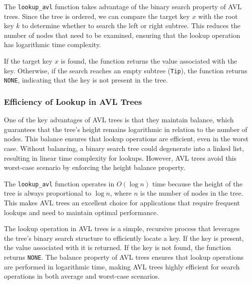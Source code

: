 The \texttt{lookup\_avl} function takes advantage of the binary search property of AVL trees. Since the tree is ordered, we can compare the target key \( x \) with the root key \( k \) to determine whether to search the left or right subtree. This reduces the number of nodes that need to be examined, ensuring that the lookup operation has logarithmic time complexity.

If the target key \( x \) is found, the function returns the value associated with the key. Otherwise, if the search reaches an empty subtree (\texttt{Tip}), the function returns \texttt{NONE}, indicating that the key is not present in the tree.

\subsubsection{Efficiency of Lookup in AVL Trees}

One of the key advantages of AVL trees is that they maintain balance, which guarantees that the tree's height remains logarithmic in relation to the number of nodes. This balance ensures that lookup operations are efficient, even in the worst case. Without balancing, a binary search tree could degenerate into a linked list, resulting in linear time complexity for lookups. However, AVL trees avoid this worst-case scenario by enforcing the height balance property.

The \texttt{lookup\_avl} function operates in \( O(\log n) \) time because the height of the tree is always proportional to \( \log n \), where \( n \) is the number of nodes in the tree. This makes AVL trees an excellent choice for applications that require frequent lookups and need to maintain optimal performance.

The lookup operation in AVL trees is a simple, recursive process that leverages the tree's binary search structure to efficiently locate a key. If the key is present, the value associated with it is returned. If the key is not found, the function returns \texttt{NONE}. The balance property of AVL trees ensures that lookup operations are performed in logarithmic time, making AVL trees highly efficient for search operations in both average and worst-case scenarios.
